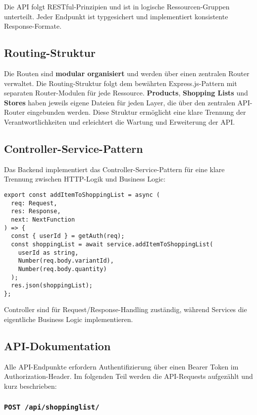 Die API folgt RESTful-Prinzipien und ist in logische Ressourcen-Gruppen unterteilt. Jeder Endpunkt ist typgesichert und implementiert konsistente Response-Formate.

\subsection{Routing-Struktur}

Die Routen sind \textbf{modular organisiert} und werden über einen zentralen Router verwaltet. Die Routing-Struktur folgt dem bewährten Express.js-Pattern mit separaten Router-Modulen für jede Ressource. \textbf{Products}, \textbf{Shopping Lists} und \textbf{Stores} haben jeweils eigene Dateien für jeden Layer, die über den zentralen API-Router eingebunden werden. Diese Struktur ermöglicht eine klare Trennung der Verantwortlichkeiten und erleichtert die Wartung und Erweiterung der API.

\subsection{Controller-Service-Pattern}

Das Backend implementiert das Controller-Service-Pattern für eine klare Trennung zwischen HTTP-Logik und Business Logic:

\begin{lstlisting}[style=typescriptstyle,caption={Controller-Beispiel: Shopping List}]
export const addItemToShoppingList = async (
  req: Request,
  res: Response,
  next: NextFunction
) => {
  const { userId } = getAuth(req);
  const shoppingList = await service.addItemToShoppingList(
    userId as string,
    Number(req.body.variantId),
    Number(req.body.quantity)
  );
  res.json(shoppingList);
};
\end{lstlisting}

Controller sind für Request/Response-Handling zuständig, während Services die eigentliche Business Logic implementieren.

\subsection{API-Dokumentation}

Alle API-Endpunkte erfordern Authentifizierung über einen Bearer Token im Authorization-Header. Im folgenden Teil werden die API-Requests aufgezählt und kurz beschrieben:

\subsubsection{\texttt{POST /api/shoppinglist/}}

